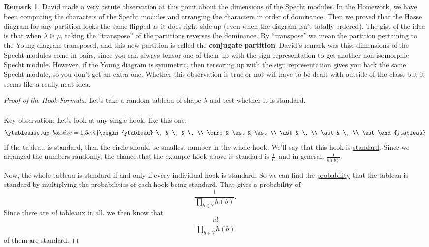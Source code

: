 \documentclass[12pt]{article}
\theoremstyle{definition}
\newtheorem*{remark}{Remark}
\begin{document}
\begin{remark}
    David \cite{David} made a very astute observation at this point about the dimensions of the Specht modules. In the Homework, we have been computing the characters of the Specht modules and arranging the characters in order of dominance. Then we proved that the Hasse diagram for any partition looks the same flipped as it does right side up (even when the diagram isn't totally ordered). The gist of the idea is that when $\lambda \trianglerighteq \mu$, taking the ``transpose'' of the partitions reverses the dominance. By ``transpose'' we mean the partition pertaining to the Young diagram transposed, and this new partition is called the \textbf{conjugate partition}. David's remark was this: dimensions of the Specht modules come in pairs, since you can always tensor one of them up with the sign representation to get another non-isomorphic Specht module. However, if the Young diagram is \underline{symmetric}, then tensoring up with the sign representation gives you back the same Specht module, so you don't get an extra one. Whether this observation is true or not will have to be dealt with outside of the class, but it seems like a really neat idea.
\end{remark}
\begin{proof}[Proof of the Hook Formula]
    Let's take a random tableau of shape $\lambda$ and test whether it is standard. \\\\
    \underline{Key observation}: Let's look at any single hook, like this one:
    \begin{equation*}
        \ytableausetup{boxsize = 1.5em}
        \begin{ytableau}
            \, & \, & \, \\
            \circ & \ast & \ast \\
            \ast & \, \\
            \ast & \, \\
            \ast
        \end{ytableau}
    \end{equation*}
    If the tableau is standard, then the circle should be smallest number in the whole hook. We'll say that this hook is \underline{standard}. Since we arranged the numbers randomly, the chance that the example hook above is standard is $\frac{1}{6}$, and in general, $\frac{1}{h(b)}$.
    
    Now, the whole tableau is standard if and only if every individual hook is standard. So we can find the \underline{probability} that the tableau is standard by multiplying the probabilities of each hook being standard. That gives a probability of 
    \begin{equation*}
        \frac{1}{\prod\limits_{b \in Y} h(b) }.
    \end{equation*}
    Since there are $n!$ tableaux in all, we then know that 
    \begin{equation*}
        \frac{n!}{\prod\limits_{b \in Y} h(b) }
    \end{equation*}
    of them are standard.
\end{proof}
\end{document}

